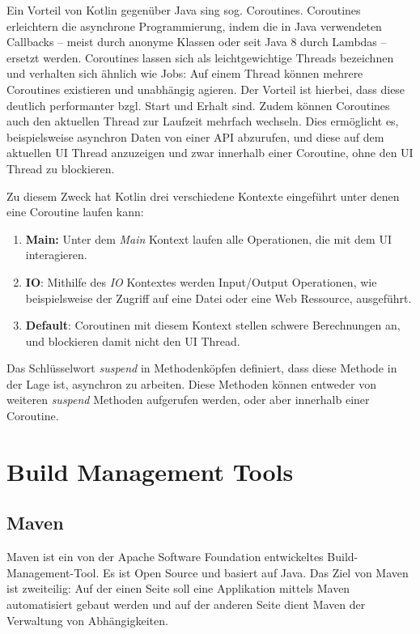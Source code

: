 				Ein Vorteil von Kotlin gegenüber Java sing sog. Coroutines. Coroutines erleichtern die asynchrone Programmierung, indem die in Java verwendeten Callbacks -- meist durch anonyme Klassen oder seit Java 8 durch Lambdas -- ersetzt werden. Coroutines lassen sich als leichtgewichtige Threads bezeichnen und verhalten sich ähnlich wie Jobs: Auf einem Thread können mehrere Coroutines existieren und unabhängig agieren. Der Vorteil ist hierbei, dass diese deutlich performanter bzgl. Start und Erhalt sind. Zudem können Coroutines auch den aktuellen Thread zur Laufzeit mehrfach wechseln. Dies ermöglicht es, beispielsweise asynchron Daten von einer API abzurufen, und diese auf dem aktuellen UI Thread anzuzeigen und zwar innerhalb einer Coroutine, ohne den UI Thread zu blockieren. 
				
				Zu diesem Zweck hat Kotlin drei verschiedene Kontexte eingeführt unter denen eine Coroutine laufen kann:
				
				\begin{enumerate}
					\item 
						\textbf{Main:} Unter dem \textit{Main} Kontext laufen alle Operationen, die mit dem \acs{UI} interagieren. 
					\item 
						\textbf{IO}: Mithilfe des \textit{\acs{IO}} Kontextes werden Input/Output Operationen, wie beispielsweise der Zugriff auf eine Datei oder eine Web Ressource, ausgeführt.
					\item 
						\textbf{Default}: Coroutinen mit diesem Kontext stellen schwere Berechnungen an, und blockieren damit nicht den \acs{UI} Thread.
				\end{enumerate}
				
				Das Schlüsselwort \textit{suspend} in Methodenköpfen definiert, dass diese Methode in der Lage ist, asynchron zu arbeiten. Diese Methoden können entweder von weiteren \textit{suspend} Methoden aufgerufen werden, oder aber innerhalb einer Coroutine.
				
	\section{Build Management Tools} %
	
		\subsection{Maven} %
			
			 Maven ist ein von der Apache Software Foundation entwickeltes Build-Management-Tool. Es ist Open Source und basiert auf Java. Das Ziel von Maven ist zweiteilig: Auf der einen Seite soll eine Applikation mittels Maven automatisiert gebaut werden und auf der anderen Seite dient Maven der Verwaltung von Abhängigkeiten. 
			 
